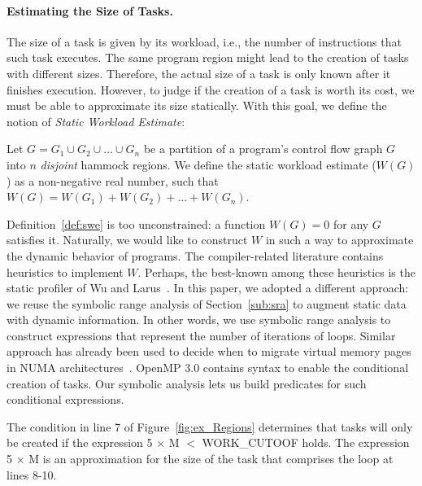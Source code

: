 \documentclass[sigplan,10pt,review,anonymous]{acmart}
\begin{document}
\paragraph{Estimating the Size of Tasks.}
The size of a task is given by its workload, i.e., the number of instructions that
such task executes.
The same program region might lead to the creation of tasks with different sizes.
Therefore, the actual size of a task is only known after it finishes execution.
However, to judge if the creation of a task is worth its cost, we must be able to
approximate its size statically.
With this goal, we define the notion of {\em Static Workload Estimate}:

\begin{definition}
\label{def:swe}
Let $G = G_1 \cup G_2 \cup \ldots \cup G_n$ be a partition of a program's control
flow graph $G$ into $n$ {\em disjoint} hammock regions.
We define the static workload estimate ($W(G)$) as a non-negative real number,
such that $W(G) = W(G_1) + W(G_2) + \ldots + W(G_n)$.
\end{definition}

Definition~\ref{def:swe} is too unconstrained: a function $W(G) = 0$ for any $G$
satisfies it.
Naturally, we would like to construct $W$ in such a way to approximate the 
dynamic behavior of programs.
The compiler-related literature contains heuristics to implement $W$.
Perhaps, the best-known among these heuristics is the static profiler of
Wu and Larus~\cite{Wu94}.
In this paper, we adopted a different approach: we reuse the symbolic range
analysis of Section~\ref{sub:sra} to augment static data with dynamic information.
In other words, we use symbolic range analysis to construct expressions that
represent the number of iterations of loops.
Similar approach has already been used to decide when to migrate virtual memory
pages in NUMA architectures~\cite{Piccoli14}.
OpenMP 3.0 contains syntax to enable the conditional creation of tasks.
Our symbolic analysis lets us build predicates for such conditional expressions.

\begin{example}
\label{ex:cond_task}
The condition in line 7 of Figure~\ref{fig:ex_Regions} determines that tasks will
only be created if the expression \textsf{5 $\times$ M $<$ WORK\_CUTOOF}
holds.
The expression \textsf{5 $\times$ M} is an approximation for the size of the
task that comprises the loop at lines 8-10.
\end{example}
\end{document}
